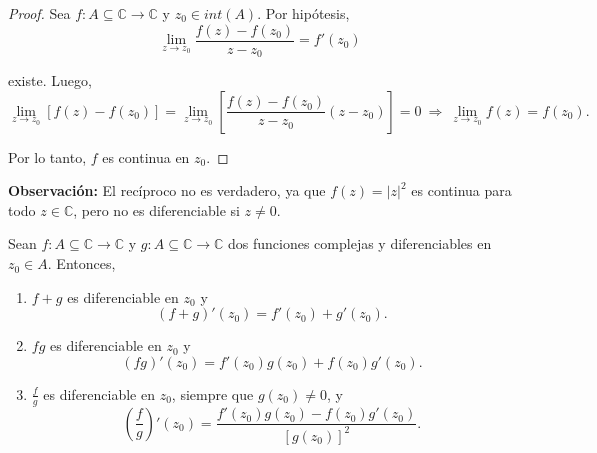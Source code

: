 \begin{proof}
Sea $f: A \subseteq \mathbb{C} \rightarrow \mathbb{C}$ y $z_0 \in int(A)$. Por hipótesis, 
$$\lim_{z \to z_0}\frac{f(z) -f(z_0)}{z-z_0} = f'(z_0)$$

existe. Luego,
$$\lim_{z \to z_0 } [f(z) - f(z_0)] = \lim_{z \to z_0} \left[ \frac{f(z) -f(z_0)}{z-z_0} (z-z_0) \right] = 0 ~\Rightarrow~ \lim_{z \to z_0 }f(z)  = f(z_0). $$

Por lo tanto, $f$ es continua en $z_0.$

\end{proof}

\textbf{Observación:} El recíproco no es verdadero, ya que $f(z) = |z|^2$ es continua para todo $z \in \mathbb{C}$, pero no es diferenciable si $z \neq 0$.

\begin{teorema}
Sean $f: A \subseteq \mathbb{C} \rightarrow \mathbb{C}$ y $g: A \subseteq \mathbb{C} \rightarrow \mathbb{C}$ dos funciones complejas y diferenciables en $z_0 \in A$. Entonces,

\begin{enumerate}
\item $f+g$ es diferenciable en $z_0$ y
$$(f+g)'(z_0) = f'(z_0) + g'(z_0).$$

\item $fg$ es diferenciable en $z_0$ y
$$(fg)'(z_0) = f'(z_0) g(z_0) + f(z_0) g'(z_0).$$

\item $\frac{f}{g}$ es diferenciable en $z_0$, siempre que $g(z_0) \neq 0$, y
$$\left( \frac{f}{g} \right)'(z_0) = \frac{f'(z_0) g(z_0) - f(z_0)g'(z_0)}{[g(z_0)]^2}.$$
\end{enumerate}
\end{teorema}

